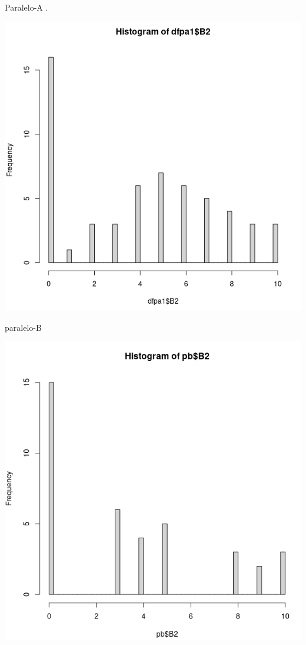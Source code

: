 \documentclass[a4pa<per,12pt,spanish]{article}
\begin{document}
\begin{minipage}[h]{0.45\linewidth}
  Paralelo-A
  .

\includegraphics[scale=0.3]{images/histoB2.png}
\end{minipage}
\begin{minipage}[h]{0.45\linewidth}
paralelo-B

\includegraphics[scale=0.3]{images/histo-PB-B2.png}
\end{minipage}
\end{document}

